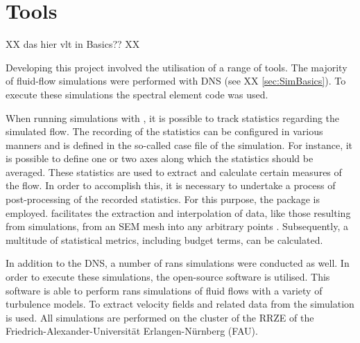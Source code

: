 \section{Tools}

XX das hier vlt in Basics?? XX

Developing this project involved the utilisation of a range of tools. The majority of fluid-flow simulations were performed with DNS (see XX \autoref{sec:SimBasics}). To execute these simulations the spectral element code  was used. 

When running simulations with , it is possible to track statistics regarding the  simulated flow.  The recording of the statistics can be configured in various manners and is defined in the so-called case file of the simulation.
 For instance, it is possible to define one or two axes along which the statistics should be averaged. 
 These statistics are used to extract and calculate certain measures of the flow. In order to accomplish this, it is necessary to undertake a process of post-processing of the recorded statistics. For this purpose,  the  package  is employed. 
  facilitates the extraction and interpolation of data, like those resulting from   simulations,  from an SEM mesh into any arbitrary points . Subsequently, a multitude of statistical metrics, including budget terms, can be calculated. 
 
In addition to the DNS,  a number of \acrshort{rans} simulations were conducted as well. In order to execute these simulations, the open-source software  is utilised. This software is able to perform \acrshort{rans} simulations of fluid flows with a variety of turbulence models. To extract velocity fields and related data from the simulation  is used. 
All simulations are performed on the cluster of the RRZE of the Friedrich-Alexander-Universität Erlangen-Nürnberg (FAU).  

